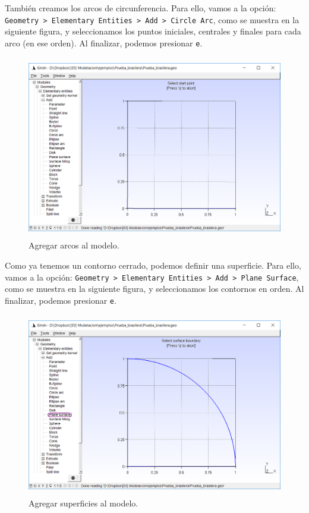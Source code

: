\documentclass[12pt,letterpaper]{article}
\begin{document}
También creamos los arcos de circunferencia. Para ello, vamos a la opción: \texttt{Geometry > Elementary Entities > Add > Circle Arc}, como se muestra en la siguiente figura, y seleccionamos los puntos iniciales, centrales y finales para cada arco (en ese orden). Al finalizar, podemos presionar \texttt{e}.
\begin{figure}[H]
    \centering
    \includegraphics[height=8cm]{img/Agregar_arcos.png} 
    \caption{Agregar arcos al modelo.}
\end{figure}

Como ya tenemos un contorno cerrado, podemos definir una superficie. Para ello, vamos a la opción: \texttt{Geometry > Elementary Entities > Add > Plane Surface}, como se muestra en la siguiente figura, y seleccionamos los contornos en orden. Al finalizar, podemos presionar \texttt{e}.
\begin{figure}[H]
    \centering
    \includegraphics[height=8cm]{img/Agregar_superficie.png} 
    \caption{Agregar superficies al modelo.}
\end{figure}
\end{document}
